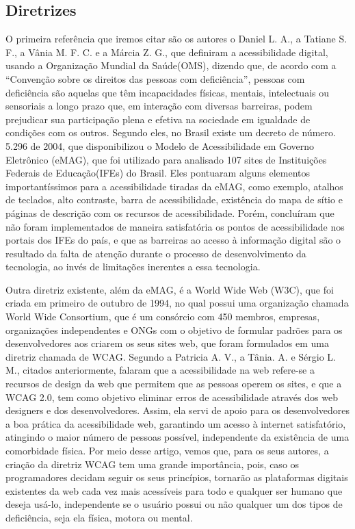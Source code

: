 \documentclass[a4paper]{article}
\begin{document}
\begin{titlepage}
\subsection{Diretrizes}
O primeira referência que iremos citar são os autores o Daniel L. A., a Tatiane S. F., a Vânia M. F. C. e a Márcia Z. G., que definiram a acessibilidade digital, usando a Organização Mundial da Saúde(OMS), dizendo que, de acordo com a “Convenção sobre os direitos das pessoas com deficiência”, pessoas com deficiência são aquelas que têm incapacidades físicas, mentais, intelectuais ou sensoriais a longo prazo que, em interação com diversas barreiras, podem prejudicar sua participação plena e efetiva na sociedade em igualdade de condições com os outros. Segundo eles, no Brasil existe um decreto de número. 5.296 de 2004, que disponibilizou o Modelo de Acessibilidade em Governo Eletrônico (eMAG), que foi utilizado para analisado 107 sites de Instituições Federais de Educação(IFEs) do Brasil. Eles pontuaram alguns elementos importantíssimos para a acessibilidade tiradas da eMAG, como exemplo, atalhos de teclados, alto contraste, barra de acessibilidade, existência do mapa de sítio e páginas de descrição com os recursos de acessibilidade. Porém, concluíram que não foram implementados de maneira satisfatória os pontos de acessibilidade nos portais dos IFEs do país, e que as barreiras ao acesso à informação digital são o resultado da falta de atenção durante o processo de desenvolvimento da tecnologia, ao invés de limitações inerentes a essa tecnologia.

Outra diretriz existente, além da eMAG, é a World Wide Web (W3C), que foi criada em primeiro de outubro de 1994, no qual possui uma organização chamada World Wide Consortium, que é um consórcio com 450 membros, empresas, organizações independentes e ONGs com o objetivo de formular padrões para os desenvolvedores aos criarem os seus sites web, que foram formulados em uma diretriz chamada de WCAG. Segundo a Patricia A. V., a Tânia. A. e Sérgio L. M., citados anteriormente, falaram que a acessibilidade na web refere-se a recursos de design da web que permitem que as pessoas operem os sites, e que a WCAG 2.0, tem como objetivo eliminar erros de acessibilidade através dos web designers e dos desenvolvedores. Assim, ela servi de apoio para os desenvolvedores a boa prática da acessibilidade web, garantindo um acesso à internet satisfatório, atingindo o maior número de pessoas possível, independente da existência de uma comorbidade física. Por meio desse artigo, vemos que, para os seus autores, a criação da diretriz WCAG tem uma grande importância, pois, caso os programadores decidam seguir os seus princípios, tornarão as plataformas digitais existentes da web cada vez mais acessíveis para todo e qualquer ser humano que deseja usá-lo, independente se o usuário possui ou não qualquer um dos tipos de deficiência, seja ela física, motora ou mental. 


\end{titlepage}
\end{document}
